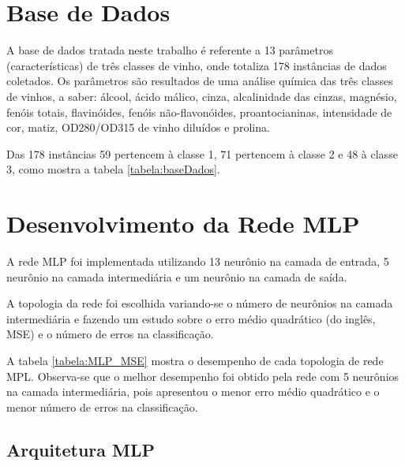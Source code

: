 
\section{Base de Dados} \label{baseDados}

A base de dados tratada neste trabalho é referente a 13 parâmetros (características) de três classes de vinho, onde totaliza 178 instâncias de dados coletados. Os parâmetros são resultados de uma análise química das três classes de vinhos, a saber: álcool, ácido málico, cinza, alcalinidade das cinzas, magnésio, fenóis totais, flavinóides, fenóis não-flavonóides, proantocianinas, intensidade de cor, matiz, OD280/OD315 de vinho diluídos e prolina.



Das 178 instâncias 59 pertencem à classe 1, 71 pertencem à classe 2 e 48 à classe 3, como mostra a tabela \ref{tabela:baseDados}.





\section{Desenvolvimento da Rede MLP} \label{desenvolvimentoMLP}

A rede MLP foi implementada utilizando 13 neurônio na camada de entrada, 5 neurônio na camada intermediária e um neurônio na camada de saída.

A topologia da rede foi escolhida variando-se o número de neurônios na camada intermediária e fazendo um estudo sobre o erro médio quadrático (do inglês, MSE) e o número de erros na classificação.


A tabela \ref{tabela:MLP_MSE} mostra o desempenho de cada topologia de rede MPL. Observa-se que o melhor desempenho foi obtido pela rede com 5 neurônios na camada intermediária, pois apresentou o menor erro médio quadrático e o menor número de erros na classificação.


\subsection{Arquitetura MLP}

